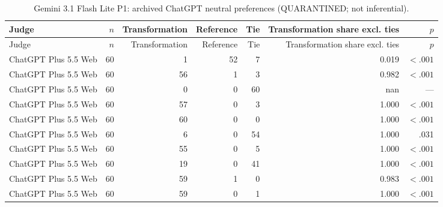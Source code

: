 \documentclass[10pt]{article}
\begin{document}
\small
\begin{longtable}{lrrrrrr}
\caption{Gemini 3.1 Flash Lite P1: archived ChatGPT neutral preferences (QUARANTINED; not inferential).}\label{tab:s5-neupref31}\\
\toprule Judge & $n$ & Transformation & Reference & Tie & Transformation share excl. ties & $p$ \\ \midrule\endfirsthead
\toprule Judge & $n$ & Transformation & Reference & Tie & Transformation share excl. ties & $p$ \\ \midrule\endhead
\bottomrule\endfoot
ChatGPT Plus 5.5 Web & 60 & 1 & 52 & 7 & 0.019 & $<.001$ \\
ChatGPT Plus 5.5 Web & 60 & 56 & 1 & 3 & 0.982 & $<.001$ \\
ChatGPT Plus 5.5 Web & 60 & 0 & 0 & 60 & nan & — \\
ChatGPT Plus 5.5 Web & 60 & 57 & 0 & 3 & 1.000 & $<.001$ \\
ChatGPT Plus 5.5 Web & 60 & 60 & 0 & 0 & 1.000 & $<.001$ \\
ChatGPT Plus 5.5 Web & 60 & 6 & 0 & 54 & 1.000 & .031 \\
ChatGPT Plus 5.5 Web & 60 & 55 & 0 & 5 & 1.000 & $<.001$ \\
ChatGPT Plus 5.5 Web & 60 & 19 & 0 & 41 & 1.000 & $<.001$ \\
ChatGPT Plus 5.5 Web & 60 & 59 & 1 & 0 & 0.983 & $<.001$ \\
ChatGPT Plus 5.5 Web & 60 & 59 & 0 & 1 & 1.000 & $<.001$ \\
\end{longtable}
\end{document}
